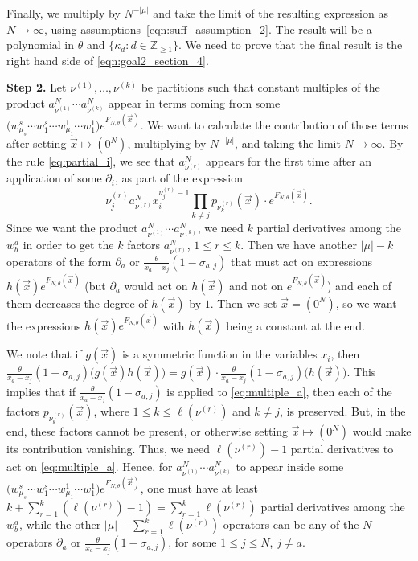 \documentclass[11pt]{article}
\theoremstyle{plain}
\newcommand{\Z}{\mathbb Z}
\newcommand{\vecx}{\vec{x}}
\begin{document}
Finally, we multiply by $N^{-|\mu|}$ and take the limit of the resulting expression as $N\to\infty$, using assumptions~\eqref{eqn:suff_assumption_2}. The result will be a polynomial in $\theta$ and $\{\kappa_d : d\in\Z_{\ge 1}\}$. 
We need to prove that the final result is the right hand side of \eqref{eqn:goal2_section_4}.

\smallskip

\textbf{Step 2.} Let $\nu^{(1)},\dots,\nu^{(k)}$ be partitions such that constant multiples of the product $a_{\nu^{(1)}}^N\cdots a_{\nu^{(k)}}^N$ appear in terms coming from some $\big(w^s_{\mu_s}\cdots w^s_1\cdots w^1_{\mu_1}\cdots w^1_1\big)e^{F_{N,\theta}(\vecx)}$.
We want to calculate the contribution of those terms after setting $\vecx\mapsto(0^N)$, multiplying by $N^{-|\mu|}$, and taking the limit $N\to\infty$. By the rule \eqref{eq:partial_i}, we see that $a_{\nu^{(r)}}^N$ appears for the first time after an application of some $\partial_i$, as part of the expression
\begin{equation}\label{eq:multiple_a}
\nu^{(r)}_j a_{\nu^{(r)}}^N x_i^{\nu^{(r)}_j-1}\prod_{k\ne j}{p_{\nu^{(r)}_k}(\vecx)}\cdot e^{F_{N,\theta}(\vecx)}.
\end{equation}
Since we want the product $a_{\nu^{(1)}}^N\cdots a_{\nu^{(k)}}^N$, we need $k$ partial derivatives among the $w^a_b$ in order to get the $k$ factors $a^N_{\nu^{(r)}}$, $1\le r\le k$.
Then we have another $|\mu|-k$ operators of the form $\partial_a$ or $\frac{\theta}{x_a-x_j}(1-\sigma_{a,j})$ that must act on expressions $h(\vecx)e^{F_{N,\theta}(\vecx)}$ (but $\partial_a$ would act on $h(\vecx)$ and not on $e^{F_{N,\theta}(\vecx)}$) and each of them decreases the degree of $h(\vecx)$ by $1$.
Then we set $\vecx=(0^N)$, so we want the expressions $h(\vecx)e^{F_{N,\theta}(\vecx)}$ with $h(\vecx)$ being a constant at the end.

We note that if $g(\vecx)$ is a symmetric function in the variables $x_i$, then $\frac{\theta}{x_a-x_j}(1-\sigma_{a,j})\big( g(\vecx)h(\vecx) \big) = g(\vecx)\cdot\frac{\theta}{x_a-x_j}(1-\sigma_{a,j})\big( h(\vecx) \big)$. This implies that if $\frac{\theta}{x_a-x_j}(1-\sigma_{a,j})$ is applied to \eqref{eq:multiple_a}, then each of the factors $p_{\nu_k^{(r)}}(\vecx)$, where $1\le k\le\ell(\nu^{(r)})$ and $k\ne j$, is preserved.
But, in the end, these factors cannot be present, or otherwise setting $\vecx\mapsto(0^N)$ would make its contribution vanishing. Thus, we need $\ell(\nu^{(r)})-1$ partial derivatives to act on \eqref{eq:multiple_a}.
Hence, for $a_{\nu^{(1)}}^N\cdots a_{\nu^{(k)}}^N$ to appear inside some $\big(w^s_{\mu_s}\cdots w^s_1\cdots w^1_{\mu_1}\cdots w^1_1\big)e^{F_{N,\theta}(\vecx)}$, one must have at least $k+\sum_{r=1}^k{(\ell(\nu^{(r)})-1)} = \sum_{r=1}^k{\ell(\nu^{(r)})}$ partial derivatives among the $w^a_b$, while the other $|\mu|-\sum_{r=1}^k{\ell(\nu^{(r)})}$ operators can be any of the $N$ operators $\partial_a$ or $\frac{\theta}{x_a-x_j}(1-\sigma_{a,j})$, for some $1\le j\le N$, $j\ne a$.
\end{document}
